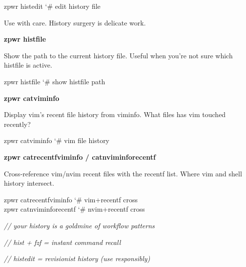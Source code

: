 \documentclass[11pt,a4paper,twoside]{book}
\begin{document}
\begin{codebox}
\color{neongreen}zpwr histedit               {\char`\#} edit history file\\
\end{codebox}

Use with care. History surgery is delicate work.


\vspace{12pt}
{\bfseries\color{neonyellow} zpwr histfile}\vspace{4pt}

Show the path to the current history file. Useful when you're not sure which histfile is active.

\begin{codebox}
\color{neongreen}zpwr histfile               {\char`\#} show histfile path\\
\end{codebox}


\vspace{12pt}
{\bfseries\color{neonyellow} zpwr catviminfo}\vspace{4pt}

Display vim's recent file history from viminfo. What files has vim touched recently?

\begin{codebox}
\color{neongreen}zpwr catviminfo             {\char`\#} vim file history\\
\end{codebox}


\vspace{12pt}
{\bfseries\color{neonyellow} zpwr catrecentfviminfo / catnviminforecentf}\vspace{4pt}

Cross-reference vim/nvim recent files with the recentf list. Where vim and shell history intersect.

\begin{codebox}
\color{neongreen}zpwr catrecentfviminfo      {\char`\#} vim+recentf cross\\
\color{neongreen}zpwr catnviminforecentf     {\char`\#} nvim+recentf cross\\
\end{codebox}

{\small\itshape\color{dimtext} // your history is a goldmine of workflow patterns}

{\small\itshape\color{dimtext} // hist + fzf = instant command recall}

{\small\itshape\color{dimtext} // histedit = revisionist history (use responsibly)}
\end{document}
